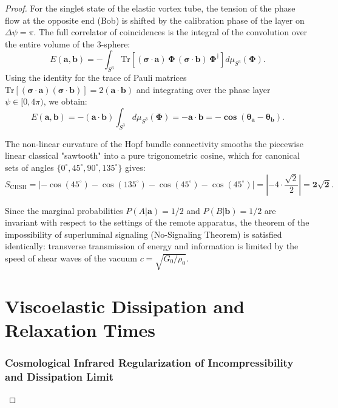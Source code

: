 \documentclass[12pt,a4paper]{article}
\begin{document}
\begin{proof}
	For the singlet state of the elastic vortex tube, the tension of the phase flow at the opposite end (Bob) is shifted by the calibration phase of the layer on $\Delta \psi = \pi$. The full correlator of coincidences is the integral of the convolution over the entire volume of the 3-sphere:
	\begin{equation}
	E(\mathbf{a}, \mathbf{b}) = -\int_{S^3} \mathrm{Tr}\left[ (\boldsymbol{\sigma} \cdot \mathbf{a}) \, \boldsymbol{\Phi} \, (\boldsymbol{\sigma} \cdot \mathbf{b}) \, \boldsymbol{\Phi}^\dagger \right] d\mu_{S^3}(\boldsymbol{\Phi}).
	\end{equation}
	Using the identity for the trace of Pauli matrices $\mathrm{Tr}[(\boldsymbol{\sigma}\cdot\mathbf{a})(\boldsymbol{\sigma}\cdot\mathbf{b})] = 2(\mathbf{a}\cdot\mathbf{b})$ and integrating over the phase layer $\psi \in [0, 4\pi)$, we obtain:
	\begin{equation}
	E(\mathbf{a}, \mathbf{b}) = -(\mathbf{a} \cdot \mathbf{b}) \int_{S^3} d\mu_{S^3}(\boldsymbol{\Phi}) = \mathbf{-\mathbf{a} \cdot \mathbf{b} = -\cos(\theta_a - \theta_b)}.
	\end{equation}
												
	The non-linear curvature of the Hopf bundle connectivity smooths the piecewise linear classical "sawtooth" into a pure trigonometric cosine, which for canonical sets of angles $\{0^\circ, 45^\circ, 90^\circ, 135^\circ\}$ gives:
	\begin{equation}
	S_{\mathrm{CHSH}} = \left| -\cos(45^\circ) - \cos(135^\circ) - \cos(45^\circ) - \cos(45^\circ) \right| = \left| -4 \cdot \frac{\sqrt{2}}{2} \right| = \mathbf{2\sqrt{2}}.
	\end{equation}
												
	Since the marginal probabilities $P(A|\mathbf{a}) = 1/2$ and $P(B|\mathbf{b}) = 1/2$ are invariant with respect to the settings of the remote apparatus, the theorem of the impossibility of superluminal signaling (No-Signaling Theorem) is satisfied identically: transverse transmission of energy and information is limited by the speed of shear waves of the vacuum $c = \sqrt{G_0/\rho_0}$.
\section{Viscoelastic Dissipation and Relaxation Times}
												
	\subsubsection{Cosmological Infrared Regularization of Incompressibility and Dissipation Limit}
												

\end{proof}
\end{document}
